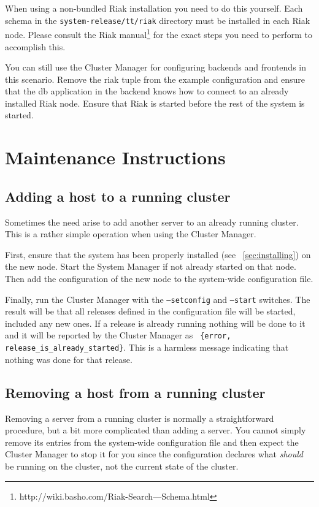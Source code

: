 \documentclass[11pt,a4paper]{report}
\begin{document}
When using a non-bundled Riak installation you need to do this yourself. Each
schema in the {\tt system-release/tt/riak} directory must be installed in each
Riak node. Please consult the Riak manual\footnote{http://wiki.basho.com/Riak-Search---Schema.html}
for the exact steps you need to perform to accomplish this.

You can still use the Cluster Manager for configuring backends and frontends in
this scenario. Remove the riak tuple from the example configuration and ensure
that the db application in the backend knows how to connect to an already
installed Riak node. Ensure that Riak is started before the rest of the system
is started.
\chapter{Maintenance Instructions}
\section{Adding a host to a running cluster}
Sometimes the need arise to add another server to an already running
cluster. This is a rather simple operation when using the Cluster Manager.

First, ensure that the system has been properly installed (see
~\ref{sec:installing}) on the new node. Start the System Manager if not already
started on that node. Then add the configuration of the new node to the
system-wide configuration file.

Finally, run the Cluster Manager with the {\tt --setconfig} and {\tt --start}
switches. The result will be that all releases defined in the configuration file
will be started, included any new ones. If a release is already running nothing
will be done to it and it will be reported by the Cluster Manager as {\tt
  \{error, release\_is\_already\_started\}}. This is a harmless message
indicating that nothing was done for that release.
\section{Removing a host from a running cluster}
Removing a server from a running cluster is normally a straightforward
procedure, but a bit more complicated than adding a server. You cannot simply
remove its entries from the system-wide configuration file and then expect the
Cluster Manager to stop it for you since the configuration declares what
\emph{should} be running on the cluster, not the current state of the cluster.
\end{document}
